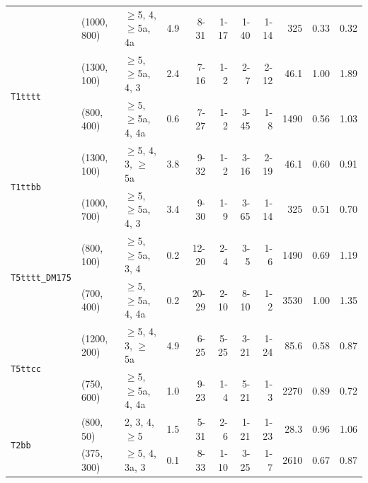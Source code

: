 \begin{table}[tb]
\begin{tabular}{ lllcrrrrrcc }
  & (1000, 800) & $\geq$5, 4, $\geq$5a, 4a & \phantom{1}4.9 & 8-31  & 1-17  & 1-40  & 1-14 & 325  & 0.33 & 0.32 \\ [0.5ex]
    \multirow{2}{*}{\texttt{T1tttt}}
  & (1300, 100) & $\geq$5, $\geq$5a, 4, 3  & \phantom{1}2.4 & 7-16  & 1-2   & 2-7   & 2-12 & 46.1 & 1.00 & 1.89 \\
  & (800, 400)  & $\geq$5, $\geq$5a, 4, 4a & \phantom{1}0.6 & 7-27  & 1-2   & 3-45  & 1-8  & 1490 & 0.56 & 1.03 \\ [0.5ex]
    \multirow{2}{*}{\texttt{T1ttbb}}
  & (1300, 100) & $\geq$5, 4, 3, $\geq$5a  & \phantom{1}3.8 & 9-32  & 1-2   & 3-16  & 2-19 & 46.1 & 0.60 & 0.91 \\
  & (1000, 700) & $\geq$5, $\geq$5a, 4, 3  & \phantom{1}3.4 & 9-30  & 1-9   & 3-65  & 1-14 & 325  & 0.51 & 0.70 \\ [0.5ex]
    \multirow{2}{*}{\texttt{T5tttt\_DM175}}
  & (800, 100)  & $\geq$5, $\geq$5a, 3, 4  & \phantom{1}0.2 & 12-20 & 2-4   & 3-5   & 1-6  & 1490 & 0.69 & 1.19 \\
  & (700, 400)  & $\geq$5, $\geq$5a, 4, 4a & \phantom{1}0.2 & 20-29 & 2-10  & 8-10  & 1-2  & 3530 & 1.00 & 1.35 \\ [0.5ex]
    \multirow{2}{*}{\texttt{T5ttcc}}  
  & (1200, 200) & $\geq$5, 4, 3, $\geq$5a  & \phantom{1}4.9 & 6-25  & 5-25  & 3-21  & 1-24 & 85.6 & 0.58 & 0.87 \\
  & (750, 600)  & $\geq$5, $\geq$5a, 4, 4a & \phantom{1}1.0 & 9-23  & 1-4   & 5-21  & 1-3  & 2270 & 0.89 & 0.72 \\ [0.5ex]
    \multirow{2}{*}{\texttt{T2bb}}
  & (800, 50)   & 2, 3, 4, $\geq$5         & \phantom{1}1.5 & 5-31  & 2-6   & 1-21  & 1-23 & 28.3 & 0.96 & 1.06 \\
  & (375, 300)  & $\geq$5, 4, 3a, 3        & \phantom{1}0.1 & 8-33  & 1-10  & 3-25  & 1-7  & 2610 & 0.67 & 0.87 \\ [0.5ex]

\end{tabular}
\end{table}
